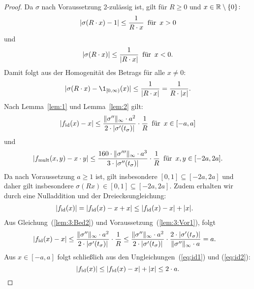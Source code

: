  \begin{proof}
  Da $\sigma$ nach Voraussetzung 2-zulässig ist, gilt für $R \geq 0$ und $x \in \mathbb{R}\setminus\{0\}\colon$ $$|\sigma(R \cdot x) - 1| \leq \frac{1}{R\cdot x} \text{\, für \,} x > 0$$ und $$|\sigma(R \cdot x)| \leq \frac{1}{|R \cdot x|} \text{\, für \,} x < 0.$$
Damit folgt aus der Homogenität des Betrags für alle $x \neq 0$: 
\begin{equation}
\label{lem:3:Bed1} 
|\sigma(R \cdot x) - \1_{[0, \infty)}(x)| \leq \frac{1}{|R \cdot x|} = \frac{1}{R \cdot |x|}.
\end{equation} 
Nach Lemma~\ref{lem:1} und Lemma~\ref{lem:2} gilt:
\begin{equation}
\label{lem:3:Bed2} 
|f_{\mathrm{id}}(x) - x| \leq \frac{\|\sigma''\|_{\infty} \cdot a^2}{2 \cdot |\sigma'(t_{\sigma})|} \cdot \frac{1}{R} \text{\, für \,} x \in [-a, a]
\end{equation}
 und 
\begin{equation}
\label{lem:3:Bed3}
 |f_{\mathrm{mult}}(x, y) - x \cdot y| \leq \frac{160 \cdot \|\sigma'''\|_{\infty} \cdot a ^3}{3 \cdot |\sigma''(t_{\sigma})|} \cdot \frac{1}{R} \text{\, für \,} x, y \in [-2a, 2a].
 \end{equation} 
Da nach Voraussetzung $a \geq 1$ ist, gilt insbesondere $[0, 1] \subseteq [-2a, 2a]$ und daher gilt insbesondere $\sigma(Rx) \in [0, 1]\subseteq [-2a, 2a].$ 
Zudem erhalten wir durch eine Nulladdition und der Dreiecksungleichung:
\begin{equation}
\label{eq:id1}
\begin{split}
|f_{\mathrm{id}}(x)| & = |f_{\mathrm{id}}(x) - x + x| \leq |f_{\mathrm{id}}(x) -x| + |x|.
\end{split}
\end{equation}
Aus Gleichung~(\ref{lem:3:Bed2}) und Voraussetzung~(\ref{lem:3:Vor1}), folgt
\begin{equation}
\label{eq:id2}
\begin{split}
|f_{\mathrm{id}}(x) -x| & \leq \frac{\|\sigma''\|_{\infty} \cdot a^2}{2 \cdot |\sigma'(t_{\sigma})|} \cdot \frac{1}{R}
\leq \frac{\|\sigma''\|_{\infty} \cdot a^2}{2 \cdot |\sigma'(t_{\sigma})|} \cdot \frac{2 \cdot |\sigma'(t_{\sigma})|}{\|\sigma''\|_{\infty} \cdot a}
= a.
\end{split}
\end{equation}
Aus $x \in [-a, a]$ folgt schließlich aus den Ungleichungen~(\ref{eq:id1}) und (\ref{eq:id2}):
\begin{equation*}
|f_{\mathrm{id}}(x)| \leq |f_{\mathrm{id}}(x) -x| + |x| \leq 2 \cdot a.
\end{equation*}

\end{proof}
